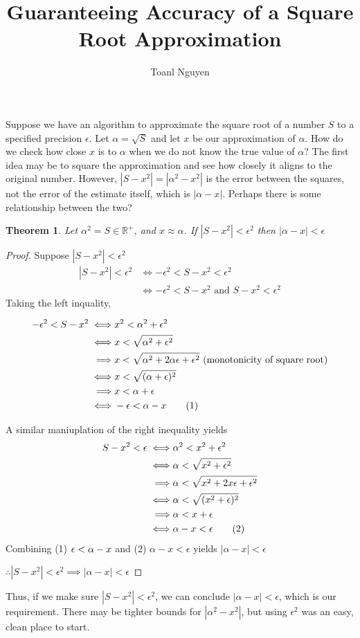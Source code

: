 \documentclass{article}
\newtheorem{theorem}{Theorem}
\newcommand\numberthis{\addtocounter{equation}{1}\tag{\theequation}}
\begin{document}
\title{Guaranteeing Accuracy of a Square Root Approximation}
\author{Toanl Nguyen}
\maketitle
Suppose we have an algorithm to approximate the square root of a number $S$ to a specified precision $\epsilon$. Let $\alpha = \sqrt{S}$ and let $x$ be our approximation of $\alpha$. How do we check how close $x$ is to $\alpha$ when we do not know the true value of $\alpha$? The first idea may be to square the approximation and see how closely it aligns to the original number. However, $|S-x^2| = |\alpha^2 - x^2|$ is the error between the squares, not the error of the estimate itself, which is $|\alpha - x|$. Perhaps there is some relationship between the two?

\begin{theorem}
Let $\alpha^2=S \in \mathbb{R^+}$, and $x \approx \alpha$. If $|S-x^2| < \epsilon^2$ then $|\alpha-x|<\epsilon$
\end{theorem}

\begin{proof}
Suppose $|S-x^2| < \epsilon^2$
\begin{align*}
|S-x^2| < \epsilon^2 &\iff -\epsilon^2 < S-x^2<\epsilon^2\\
                  &\iff -\epsilon^2 < S-x^2 \mbox{ and } S-x^2<\epsilon^2
\end{align*}
Taking the left inquality,

\begin{align*}
-\epsilon^2 < S-x^2 \iff& x^2 < \alpha^2 + \epsilon^2\\
\iff& x < \sqrt{\alpha^2 + \epsilon^2}\\
\implies& x < \sqrt{\alpha^2 + 2\alpha\epsilon + \epsilon^2} \mbox{  (monotonicity of square root)}\\
\iff& x < \sqrt{(\alpha + \epsilon)^2}\\
\implies& x < \alpha + \epsilon\\
\iff& -\epsilon < \alpha - x \numberthis
\end{align*}

A similar maniuplation of the right inequality yields
\begin{align*}
S-x^2 < \epsilon \iff& \alpha^2 < x^2 + \epsilon^2\\
\iff& \alpha < \sqrt{x^2 + \epsilon^2}\\
\implies& \alpha < \sqrt{x^2 + 2x\epsilon + \epsilon^2}\\
\iff& \alpha < \sqrt{(x^2 + \epsilon)^2}\\
\implies& \alpha < x + \epsilon\\
\iff& \alpha - x < \epsilon \numberthis
\end{align*}
Combining (1) $\-\epsilon < \alpha - x$ and (2) $\alpha - x < \epsilon$ yields
$|\alpha - x| < \epsilon$

$\therefore |S - x^2| < \epsilon^2 \implies |\alpha - x | < \epsilon$
\end{proof}
Thus, if we make sure $|S-x^2| < \epsilon^2$, we can conclude $|\alpha - x| < \epsilon$, which is our requirement. There may be tighter bounds for $|\alpha^2 - x^2|$, but using $\epsilon^2$ was an easy, clean place to start.
\end{document}
